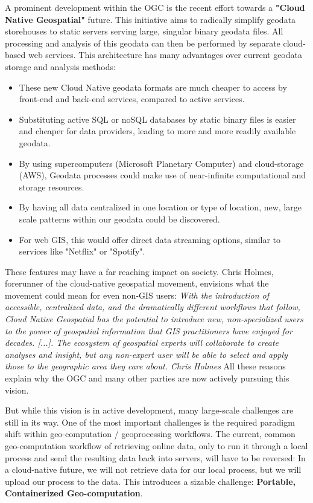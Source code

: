 A prominent development within the OGC is the recent effort towards a \textbf{"Cloud Native Geospatial"} future. 
This initiative aims to radically simplify geodata storehouses to static servers serving large, singular binary geodata files. All processing and analysis of this geodata can then be performed by separate cloud-based web services. 
This architecture has many advantages over current geodata storage and analysis methods:
\begin{itemize}
  \item These new Cloud Native geodata formats are much cheaper to access by front-end and back-end services, compared to active services.
  \item Substituting active SQL or noSQL databases by static binary files is easier and cheaper for data providers, leading to more and more readily available geodata.
  \item By using supercomputers (Microsoft Planetary Computer) and cloud-storage (AWS), Geodata processes could make use of near-infinite computational and storage resources. 
  \item By having all data centralized in one location or type of location, new, large scale patterns within our geodata could be discovered.  
  \item For web GIS, this would offer direct data streaming options, similar to services like "Netflix" or "Spotify".  
\end{itemize}

These features may have a far reaching impact on society. Chris Holmes, forerunner of the cloud-native geospatial movement, envisions what the movement could mean for even non-GIS users: 
\emph{
  With the introduction of accessible, centralized data, and the dramatically different workflows that follow, Cloud Native Geospatial has the potential to introduce new, non-specialized users to the power of geospatial information that GIS practitioners have enjoyed for decades. [...]. The ecosystem of geospatial experts will collaborate to create analyses and insight, but any non-expert user will be able to select and apply those to the geographic area they care about. \~ Chris Holmes
}
All these reasons explain why the OGC and many other parties are now actively pursuing this vision.

But while this vision is in active development, many large-scale challenges are still in its way. 
One of the most important challenges is the required paradigm shift within geo-computation / geoprocessing workflows. 
The current, common geo-computation workflow of retrieving online data, only to run it through a local process and send the resulting data back into servers, will have to be reversed: In a cloud-native future, we will not retrieve data for our local process, but we will upload our process to the data.  
This introduces a sizable challenge: \textbf{Portable, Containerized Geo-computation}.

